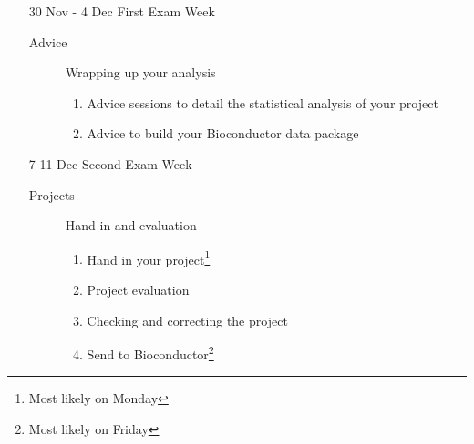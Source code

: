 \documentclass[letterpaper,12pt]{article}
\begin{document}
\begin{itemize}
  \item[30 Nov - 4 Dec] First Exam Week
  \begin{description}
  \item[Advice] Wrapping up your analysis
  \begin{enumerate}
  \item Advice sessions to detail the statistical analysis of your project
  \item Advice to build your Bioconductor data package
  \end{enumerate}
  \end{description}
  
  \item[7-11 Dec] Second Exam Week
  \begin{description}
  \item[Projects] Hand in and evaluation
  \begin{enumerate}
  \item Hand in your project\footnote{Most likely on Monday}
  \item Project evaluation
  \item Checking and correcting the project
  \item Send to Bioconductor\footnote{Most likely on Friday}
  \end{enumerate}
  \end{description}

  
\end{itemize}
\end{document}

